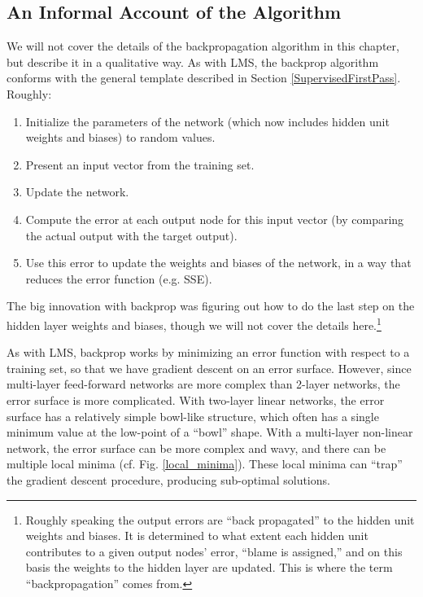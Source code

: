 \subsection{An Informal Account of the Algorithm}


We will not cover the details of the backpropagation algorithm in this chapter, but describe it in a qualitative way. As with LMS, the backprop algorithm conforms with the general template described in Section \ref{SupervisedFirstPass}. Roughly:
\begin{enumerate}
\item Initialize the parameters of the network (which now includes hidden unit weights and biases) to random values.
\item Present an input vector from the training set.
\item Update the network.
\item Compute the error at each output node for this input vector (by comparing the actual output with the target output).
\item Use this error to update the weights and biases of the network, in a way that reduces the error function (e.g. SSE).
\end{enumerate}

The big innovation with backprop was figuring out how to do the last step on the hidden layer weights and biases, though we will not cover the details here.\footnote{Roughly speaking the output errors are ``back propagated'' to the hidden unit weights and biases. It is determined to what extent each hidden unit contributes to a given output nodes' error, ``blame is assigned,'' and on this basis the weights to the hidden layer are updated. This is where the term ``backpropagation'' comes from.}  

As with LMS, backprop works by minimizing an error function with respect to a training set, so that we have gradient descent on an error surface. However, since multi-layer feed-forward networks are more complex than 2-layer networks, the error surface is more complicated. With two-layer linear networks, the error surface has a relatively simple bowl-like structure, which often has a single minimum value at the low-point of a ``bowl'' shape. With a multi-layer non-linear network, the error surface can be more complex and wavy, and there can be multiple local minima (cf. Fig. \ref{local_minima}). These local minima can ``trap'' the gradient descent procedure, producing sub-optimal solutions.

